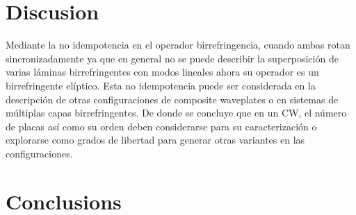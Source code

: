 \documentclass[twocolumn, A4]{webofc}
\begin{document}
\section{Discusion}\label{Dis}
Mediante la no idempotencia en el operador birrefringencia, cuando ambas rotan sincronizadamente ya que en general no se puede describir la superposición de varias láminas birrefringentes con modos lineales  ahora su operador es un birrefringente elíptico. Esta no idempotencia puede ser considerada en la descripción de otras configuraciones de composite waveplates o en sistemas de múltiplas capas birrefringentes. De donde se concluye que en un CW, el número de placas así como su orden deben considerarse para su caracterización o explorarse como grados de libertad para generar otras variantes en las configuraciones.
\section{Conclusions}
 
%
	

\end{document}
